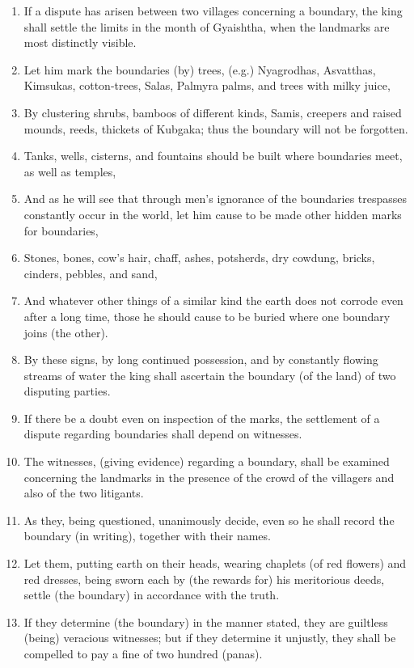 \begin{enumerate}
\item If a dispute has arisen between two villages concerning a boundary, the king shall settle the limits in the month of Gyaishtha, when the landmarks are most distinctly visible.
\item Let him mark the boundaries (by) trees, (e.g.) Nyagrodhas, Asvatthas, Kimsukas, cotton-trees, Salas, Palmyra palms, and trees with milky juice,
\item By clustering shrubs, bamboos of different kinds, Samis, creepers and raised mounds, reeds, thickets of Kubgaka; thus the boundary will not be forgotten.
\item Tanks, wells, cisterns, and fountains should be built where boundaries meet, as well as temples,
\item And as he will see that through men's ignorance of the boundaries trespasses constantly occur in the world, let him cause to be made other hidden marks for boundaries,
\item Stones, bones, cow's hair, chaff, ashes, potsherds, dry cowdung, bricks, cinders, pebbles, and sand,
\item And whatever other things of a similar kind the earth does not corrode even after a long time, those he should cause to be buried where one boundary joins (the other).
\item By these signs, by long continued possession, and by constantly flowing streams of water the king shall ascertain the boundary (of the land) of two disputing parties.
\item If there be a doubt even on inspection of the marks, the settlement of a dispute regarding boundaries shall depend on witnesses.
\item The witnesses, (giving evidence) regarding a boundary, shall be examined concerning the landmarks in the presence of the crowd of the villagers and also of the two litigants.
\item As they, being questioned, unanimously decide, even so he shall record the boundary (in writing), together with their names.
\item Let them, putting earth on their heads, wearing chaplets (of red flowers) and red dresses, being sworn each by (the rewards for) his meritorious deeds, settle (the boundary) in accordance with the truth.
\item If they determine (the boundary) in the manner stated, they are guiltless (being) veracious witnesses; but if they determine it unjustly, they shall be compelled to pay a fine of two hundred (panas).

\end{enumerate}
